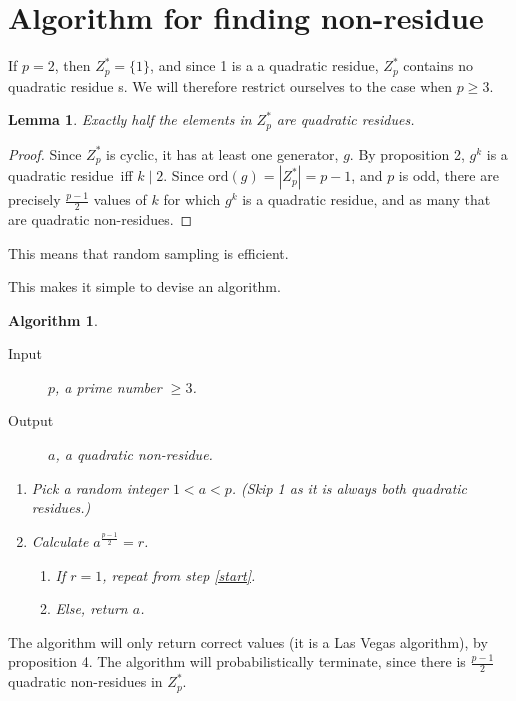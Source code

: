 \documentclass{article}
\title{\Qr}
\author{Rikard Hjort\\\texttt{hjortr@student.chalmers.se}}
\date{\today}
\newcommand{\z}{Z^*_p}
\newcommand{\ord}{\text{ord}}
\newcommand{\qr}{{quadratic residue}}
\newcommand{\qnr}{{quadratic non-residue}}
\newtheorem{algorithm}[theorem]{Algorithm}
\newtheorem{lemma}[theorem]{Lemma}
\begin{document}
\maketitle
\section{Algorithm for finding non-residue}

If $p = 2$, then $\z = \{1\}$, and since 1 is a a \qr, $\z$ contains no \qr
s. We will therefore restrict ourselves to the case when $p \geq 3$.

\begin{lemma}\label{half}
  Exactly half the elements in $\z$ are \qr s.
\end{lemma}
\begin{proof}
  Since $\z$ is cyclic, it has at least one generator, $g$. By proposition 2,
  $g^k$ is a \qr~iff $k \mid 2$. Since $\ord(g) = |\z|= p-1$, and $p$ is odd,
  there are precisely $\frac{p-1}{2}$ values of $k$ for which $g^k$ is a \qr,
  and as many that are \qnr s.
\end{proof}

This means that random sampling is efficient.

This makes it simple to devise an algorithm.
\begin{algorithm}
  \hfill\break
  \begin{description}
  \item[Input] $p$, a prime number $\geq 3$.
  \item[Output] $a$, a \qnr.
  \end{description}
  \begin{enumerate}
  \item\label{start} Pick a random integer $1 < a < p$. (Skip 1 as it is always
    both \qr s.)
  \item Calculate $a^{\frac{p-1}{2}} = r$.
    \begin{enumerate}
    \item If $r = 1$, repeat from step \ref{start}.
    \item Else, return $a$.
    \end{enumerate}
  \end{enumerate}
\end{algorithm}

The algorithm will only return correct values (it is a Las Vegas algorithm),
by proposition 4. The algorithm will probabilistically terminate, since
there is $\frac{p-1}{2}$ \qnr s in $\z$.
\end{document}
